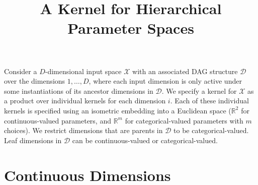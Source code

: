 \documentclass[letterpaper]{article}
\newcommand{\reals}{\mathds{R}}
\begin{document}
\title{A Kernel for Hierarchical Parameter Spaces}



\maketitle


Consider a $D$-dimensional input space $\mathcal{X}$ with an associated DAG structure $\mathcal{D}$ over the dimensions $1,\dots,D$, where each input dimension 
is only active under some instantiations of its ancestor dimensions in $\mathcal{D}$.
We specify a kernel for $\mathcal{X}$ as a product over individual kernels for each dimension $i$. Each of these individual kernels is specified using an isometric embedding into a Euclidean space ($\reals^2$ for continuous-valued parameters, and $\reals^m$ for categorical-valued parameters with $m$ choices). We restrict dimensions that are parents in $\mathcal{D}$ to be categorical-valued. Leaf dimensions in $\mathcal{D}$ can be continuous-valued or categorical-valued.


\section{Continuous Dimensions}
\end{document}
